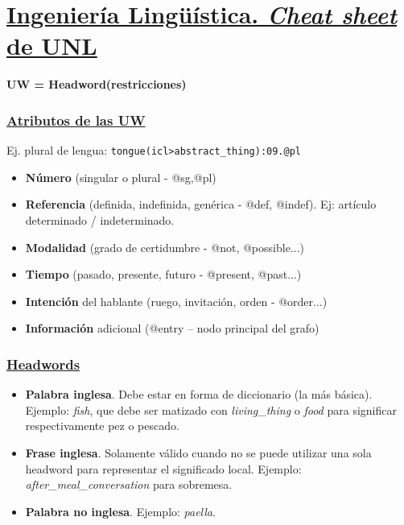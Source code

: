 \documentclass{article}
\begin{document}
\section*{\huge{\underline{Ingeniería Lingüística. \emph{Cheat sheet} de UNL}}}

\begin{multicols*}{3}

\textbf {UW = Headword(restricciones)}

\subsubsection*{\underline{Atributos de las UW}}

Ej. plural de lengua: \verb+tongue(icl>abstract_thing):09.@pl+

\begin{itemize}[itemsep=0pt, parsep=0pt, leftmargin=1em]
    \item \textbf{Número} (singular o plural - @sg,@pl)
    \item \textbf{Referencia} (definida, indefinida, genérica - @def, @indef). Ej: artículo determinado / indeterminado.
    \item \textbf{Modalidad} (grado de certidumbre - @not, @possible...)
    \item \textbf{Tiempo} (pasado, presente, futuro - @present, @past...)
    \item \textbf{Intención} del hablante (ruego, invitación, orden - @order...)
    \item \textbf{Información} adicional (@entry – nodo principal del grafo)
\end{itemize}

\subsubsection*{\underline{Headwords}}

\begin{itemize}[itemsep=0pt, parsep=0pt, leftmargin=1em]
    \item \textbf{Palabra inglesa}. Debe estar en forma de diccionario (la más básica). Ejemplo: \emph{fish}, que debe ser matizado con \emph{living\_thing} o \emph{food} para significar respectivamente pez o pescado.
    \item \textbf{Frase inglesa}. Solamente válido cuando no se puede utilizar una sola headword para representar el significado local. Ejemplo: \emph{after\_meal\_conversation} para sobremesa. 
    \item \textbf{Palabra no inglesa}. Ejemplo: \emph{paella}.
\end{itemize}


\end{multicols*}
\end{document}
